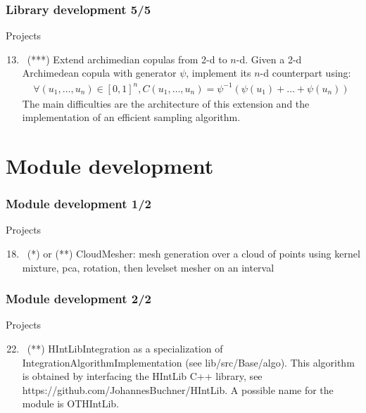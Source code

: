 \documentclass[8pt]{beamer}
\begin{document}
\begin{frame}
  \frametitle{Library development 5/5}
  \begin{block}{Projects}
    \begin{enumerate}
      \setcounter{enumi}{12}
    \item~(***) Extend archimedian copulas from 2-d to $n$-d. Given a 2-d Archimedean copula with generator $\psi$, implement its $n$-d counterpart using:
      \begin{align}
        \forall (u_1,\dots,u_n)\in[0,1]^n, C(u_1,\dots,u_n)=\psi^{-1}\left(\psi(u_1)+\dots+\psi(u_n)\right)
      \end{align}
      The main difficulties are the architecture of this extension and the implementation of an efficient sampling algorithm.
    \end{enumerate}
  \end{block}
\end{frame}

\section{Module development}

\begin{frame}
  \frametitle{Module development 1/2}
  \begin{block}{Projects}
    \begin{enumerate}
      \setcounter{enumi}{17}
    \item~(*) or (**) \alert{\ttfamily CloudMesher}: mesh generation over a cloud of points using kernel mixture, pca, rotation, then levelset mesher on an interval
    \end{enumerate}
  \end{block}
\end{frame}

\begin{frame}
  \frametitle{Module development 2/2}
  \begin{block}{Projects}
    \begin{enumerate}
      \setcounter{enumi}{21}
    \item~(**) \alert{\ttfamily HIntLibIntegration} as a specialization of {\ttfamily IntegrationAlgorithmImplementation} (see {\ttfamily lib/src/Base/algo}). This algorithm is obtained by interfacing the HIntLib C++ library, see \alert{https://github.com/JohannesBuchner/HIntLib}. A possible name for the module is \alert{OTHIntLib}.
    \end{enumerate}
  \end{block}
\end{frame}
\end{document}

